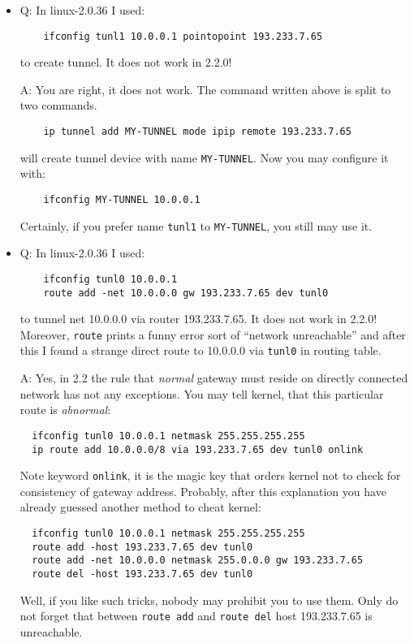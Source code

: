 \begin{itemize}

\item
Q: In linux-2.0.36 I used:
\begin{verbatim}
    ifconfig tunl1 10.0.0.1 pointopoint 193.233.7.65
\end{verbatim}
to create tunnel. It does not work in 2.2.0!

A: You are right, it does not work. The command written above is split to two commands.
\begin{verbatim}
    ip tunnel add MY-TUNNEL mode ipip remote 193.233.7.65
\end{verbatim}
will create tunnel device with name \verb|MY-TUNNEL|. Now you may configure
it with:
\begin{verbatim}
    ifconfig MY-TUNNEL 10.0.0.1
\end{verbatim}
Certainly, if you prefer name \verb|tunl1| to \verb|MY-TUNNEL|,
you still may use it.

\item
Q: In linux-2.0.36 I used:
\begin{verbatim}
    ifconfig tunl0 10.0.0.1
    route add -net 10.0.0.0 gw 193.233.7.65 dev tunl0
\end{verbatim}
to tunnel net 10.0.0.0 via router 193.233.7.65. It does not
work in 2.2.0! Moreover, \verb|route| prints a funny error sort of
``network unreachable'' and after this I found a strange direct route
to 10.0.0.0 via \verb|tunl0| in routing table.

A: Yes, in 2.2 the rule that {\em normal} gateway must reside on directly
connected network has not any exceptions. You may tell kernel, that
this particular route is {\em abnormal}:
\begin{verbatim}
  ifconfig tunl0 10.0.0.1 netmask 255.255.255.255
  ip route add 10.0.0.0/8 via 193.233.7.65 dev tunl0 onlink
\end{verbatim}
Note keyword \verb|onlink|, it is the magic key that orders kernel
not to check for consistency of gateway address.
Probably, after this explanation you have already guessed another method
to cheat kernel:
\begin{verbatim}
  ifconfig tunl0 10.0.0.1 netmask 255.255.255.255
  route add -host 193.233.7.65 dev tunl0
  route add -net 10.0.0.0 netmask 255.0.0.0 gw 193.233.7.65
  route del -host 193.233.7.65 dev tunl0
\end{verbatim}
Well, if you like such tricks, nobody may prohibit you to use them.
Only do not forget
that between \verb|route add| and \verb|route del| host 193.233.7.65 is
unreachable.


\end{itemize}
